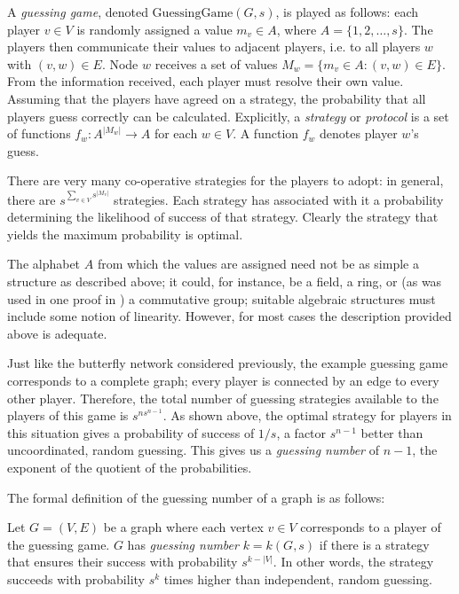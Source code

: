 \newpage

\begin{definition}

A \emph{guessing game}, denoted $\mathrm{GuessingGame}(G, s)$, is played as follows: each player $v \in V$ is randomly assigned a value $m_v \in A$, where $A = \{1, 2, \dots, s\}$. The players then communicate their values to adjacent players, i.e. to all players $w$ with $(v, w) \in E$. Node $w$ receives a set of values $M_w = \{m_v \in A : (v, w) \in E\}$. From the information received, each player must resolve their own value. Assuming that the players have agreed on a strategy, the probability that all players guess correctly can be calculated. Explicitly, a \emph{strategy} or \emph{protocol} is a set of functions $f_w : A^{|M_w|} \rightarrow A$ for each $w \in V$. A function $f_w$ denotes player $w$'s guess.

\end{definition}

There are very many co-operative strategies for the players to adopt: in general, there are $s^{\sum _{v \in V} {s^{|M_v|}}}$ strategies. Each strategy has associated with it a probability determining the likelihood of success of that strategy. Clearly the strategy that yields the maximum probability is optimal.

The alphabet $A$ from which the values are assigned need not be as simple a structure as described above; it could, for instance, be a field, a ring, or (as was used in one proof in \cite{riis2005util}) a commutative group; suitable algebraic structures must include some notion of linearity. However, for most cases the description provided above is adequate.

Just like the butterfly network considered previously, the example guessing game corresponds to a complete graph; every player is connected by an edge to every other player. Therefore, the total number of guessing strategies available to the players of this game is $s^{ns^{n - 1}}$. As shown above, the optimal strategy for players in this situation gives a probability of success of $1/s$, a factor $s^{n - 1}$ better than uncoordinated, random guessing. This gives us a \emph{guessing number} of $n - 1$, the exponent of the quotient of the probabilities.

The formal definition of the guessing number of a graph is as follows:

\begin{definition}

Let $G = (V, E)$ be a graph where each vertex $v \in V$ corresponds to a player of the guessing game. $G$ has \emph{guessing number} $k = k(G, s)$ if there is a strategy that ensures their success with probability $s^{k - |V|}$. In other words, the strategy succeeds with probability $s^k$ times higher than independent, random guessing.

\end{definition}

